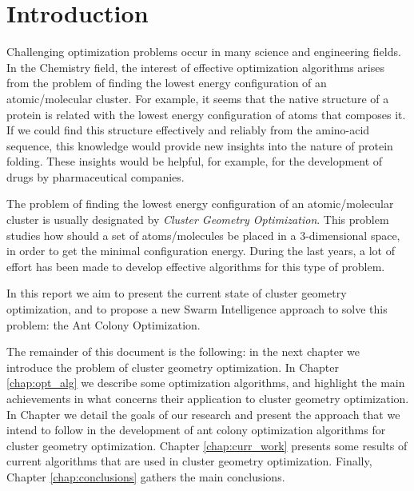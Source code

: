 \chapter{Introduction}
Challenging optimization problems occur in many science and engineering fields. In the Chemistry field, the interest of effective optimization algorithms arises from the problem of finding the lowest energy configuration of an atomic/molecular cluster. For example, it seems that the native structure of a protein is related with the lowest energy configuration of atoms that composes it\cite{wales97}. If we could find this structure effectively and reliably from the amino-acid sequence, this knowledge would provide new insights into the nature of protein folding. These insights would be helpful, for example, for the development of drugs by pharmaceutical companies.

The problem of finding the lowest energy configuration of an atomic/molecular cluster is usually designated by \emph{Cluster Geometry Optimization}. This problem studies how should a set of atoms/molecules be placed in a 3-dimensional space, in order to get the minimal configuration energy. During the last years, a lot of effort has been made to develop effective algorithms for this type of problem.

In this report we aim to present the current state of cluster geometry optimization, and to propose a new Swarm Intelligence approach to solve this problem: the Ant Colony Optimization.

The remainder of this document is the following: in the next chapter we introduce the problem of cluster geometry optimization. In Chapter \ref{chap:opt_alg} we describe some optimization algorithms, and highlight the main achievements in what concerns their application to cluster geometry optimization. In Chapter  we detail the goals of our research and present the approach that we intend to follow in the development of ant colony optimization algorithms for cluster geometry optimization. Chapter \ref{chap:curr_work} presents some results of current algorithms that are used in cluster geometry optimization. Finally, Chapter \ref{chap:conclusions} gathers the main conclusions.




